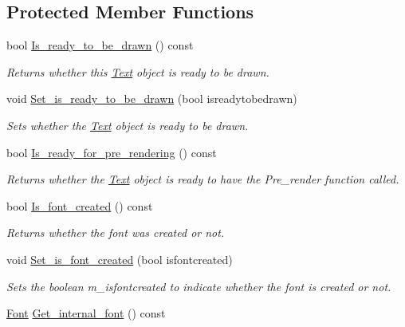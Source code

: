 \subsection*{Protected Member Functions}
\begin{DoxyCompactItemize}
\item 
bool \hyperlink{classjetfuel_1_1draw_1_1Text_a2626023a1aa6998147ea40670d0fab8d}{Is\+\_\+ready\+\_\+to\+\_\+be\+\_\+drawn} () const
\begin{DoxyCompactList}\small\item\em Returns whether this \hyperlink{classjetfuel_1_1draw_1_1Text}{Text} object is ready to be drawn. \end{DoxyCompactList}\item 
void \hyperlink{classjetfuel_1_1draw_1_1Text_a9d7e2d4cd2ca03fa2ca03f91964b26f7}{Set\+\_\+is\+\_\+ready\+\_\+to\+\_\+be\+\_\+drawn} (bool isreadytobedrawn)
\begin{DoxyCompactList}\small\item\em Sets whether the \hyperlink{classjetfuel_1_1draw_1_1Text}{Text} object is ready to be drawn. \end{DoxyCompactList}\item 
bool \hyperlink{classjetfuel_1_1draw_1_1Text_a3318092f2bf3d73b08c9e440b3e1e53c}{Is\+\_\+ready\+\_\+for\+\_\+pre\+\_\+rendering} () const
\begin{DoxyCompactList}\small\item\em Returns whether the \hyperlink{classjetfuel_1_1draw_1_1Text}{Text} object is ready to have the Pre\+\_\+render function called. \end{DoxyCompactList}\item 
bool \hyperlink{classjetfuel_1_1draw_1_1Text_a179a3fb69ac28cba38a6fbfe541e175b}{Is\+\_\+font\+\_\+created} () const
\begin{DoxyCompactList}\small\item\em Returns whether the font was created or not. \end{DoxyCompactList}\item 
void \hyperlink{classjetfuel_1_1draw_1_1Text_a62bbae5ffafd2dbc327b79719c84d253}{Set\+\_\+is\+\_\+font\+\_\+created} (bool isfontcreated)
\begin{DoxyCompactList}\small\item\em Sets the boolean m\+\_\+isfontcreated to indicate whether the font is created or not. \end{DoxyCompactList}\item 
\hyperlink{classjetfuel_1_1draw_1_1Font}{Font} \hyperlink{classjetfuel_1_1draw_1_1Text_a32e999790061eb568e3c71e23bee7be0}{Get\+\_\+internal\+\_\+font} () const

\end{DoxyCompactItemize}
